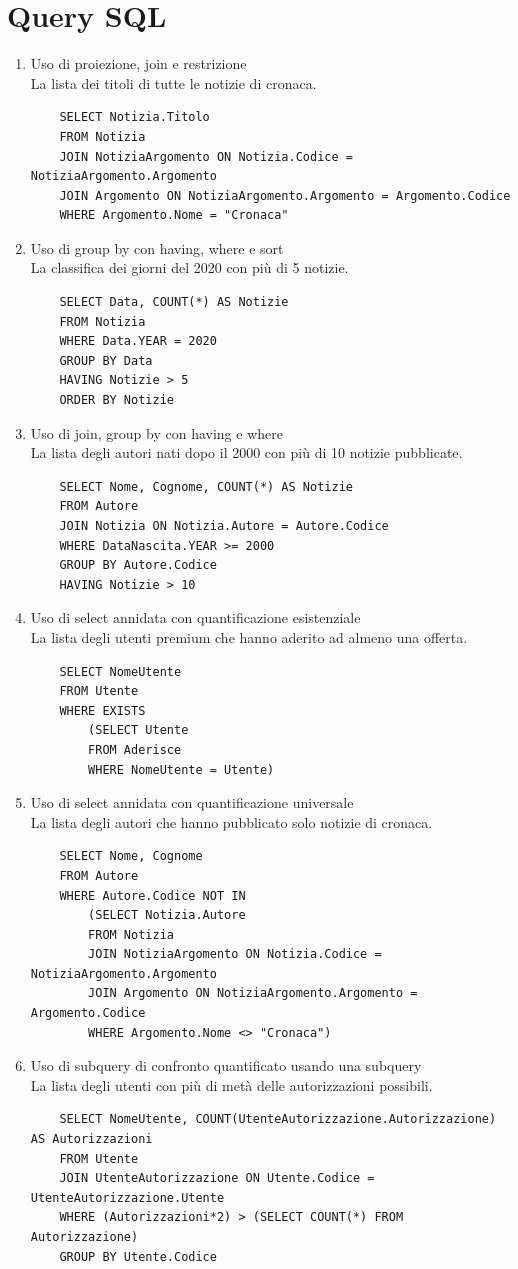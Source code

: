 \documentclass[10pt]{article}
\begin{document}
\section{Query SQL}
\begin{enumerate}
	\item Uso di proiezione, join e restrizione\\
	La lista dei titoli di tutte le notizie di cronaca.
	\begin{lstlisting}
	SELECT Notizia.Titolo
	FROM Notizia
	JOIN NotiziaArgomento ON Notizia.Codice = NotiziaArgomento.Argomento
	JOIN Argomento ON NotiziaArgomento.Argomento = Argomento.Codice
	WHERE Argomento.Nome = "Cronaca"
	\end{lstlisting}
	\item Uso di group by con having, where e sort\\
	La classifica dei giorni del 2020 con più di 5 notizie.
	\begin{lstlisting}
	SELECT Data, COUNT(*) AS Notizie
	FROM Notizia
	WHERE Data.YEAR = 2020
	GROUP BY Data
	HAVING Notizie > 5
	ORDER BY Notizie
	\end{lstlisting}
	\item Uso di join, group by con having e where\\
	La lista degli autori nati dopo il 2000 con più di 10 notizie pubblicate.
	\begin{lstlisting}
	SELECT Nome, Cognome, COUNT(*) AS Notizie
	FROM Autore
	JOIN Notizia ON Notizia.Autore = Autore.Codice
	WHERE DataNascita.YEAR >= 2000
	GROUP BY Autore.Codice
	HAVING Notizie > 10
	\end{lstlisting}
	\item Uso di select annidata con quantificazione esistenziale\\
	La lista degli utenti premium che hanno aderito ad almeno una offerta.
	\begin{lstlisting}
	SELECT NomeUtente
	FROM Utente
	WHERE EXISTS
		(SELECT Utente
		FROM Aderisce
		WHERE NomeUtente = Utente)
	\end{lstlisting}
	\item Uso di select annidata con quantificazione universale\\
	La lista degli autori che hanno pubblicato solo notizie di cronaca.
	\begin{lstlisting}
	SELECT Nome, Cognome
	FROM Autore
	WHERE Autore.Codice NOT IN
		(SELECT Notizia.Autore
		FROM Notizia
		JOIN NotiziaArgomento ON Notizia.Codice = NotiziaArgomento.Argomento
		JOIN Argomento ON NotiziaArgomento.Argomento = Argomento.Codice
		WHERE Argomento.Nome <> "Cronaca")
	\end{lstlisting}
	\item Uso di subquery di confronto quantificato usando una subquery\\
	La lista degli utenti con più di metà delle autorizzazioni possibili.
	\begin{lstlisting}
	SELECT NomeUtente, COUNT(UtenteAutorizzazione.Autorizzazione) AS Autorizzazioni
	FROM Utente
	JOIN UtenteAutorizzazione ON Utente.Codice = UtenteAutorizzazione.Utente
	WHERE (Autorizzazioni*2) > (SELECT COUNT(*) FROM Autorizzazione)
	GROUP BY Utente.Codice
	\end{lstlisting}
\end{enumerate}
\pagebreak
\end{document}
